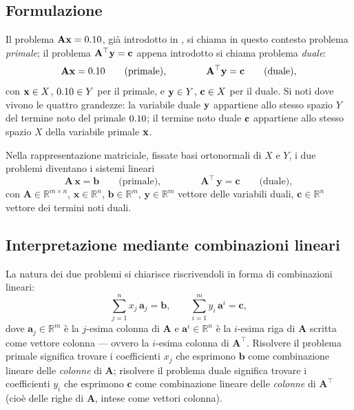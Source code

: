 \subsection{Formulazione}

Il problema $\mathbf{A}\mathbf{x}=0.10$, già introdotto in , si chiama in questo contesto problema \textit{primale}; il problema $\mathbf{A}^\top\mathbf{y}=\mathbf{c}$ appena introdotto si chiama problema \textit{duale}:
\begin{equation}\label{eq:primale}
	\mathbf{A}\mathbf{x}=0.10 \qquad \text{(primale)}, \qquad\qquad
	\mathbf{A}^\top\mathbf{y}=\mathbf{c} \qquad \text{(duale)},
\end{equation}
con $\mathbf{x}\in X$, $0.10\in Y$ per il primale, e $\mathbf{y}\in Y$, $\mathbf{c}\in X$ per il duale. Si noti dove vivono le quattro grandezze: la variabile duale $\mathbf{y}$ appartiene allo stesso spazio $Y$ del termine noto del primale $0.10$; il termine noto duale $\mathbf{c}$ appartiene allo stesso spazio $X$ della variabile primale $\mathbf{x}$. 

Nella rappresentazione matriciale, fissate basi ortonormali di $X$ e $Y$, i due problemi diventano i sistemi lineari
\begin{equation}\label{eq:duale}
	\bm{A}\,\bm{x} = \bm{b} \qquad \text{(primale)}, \qquad\qquad
	\bm{A}^\top\,\bm{y} = \bm{c} \qquad \text{(duale)},
\end{equation}
con $\bm{A} \in \mathbb{R}^{m \times n}$, $\bm{x} \in \mathbb{R}^n$, $\bm{b} \in \mathbb{R}^m$, $\bm{y} \in \mathbb{R}^m$ vettore delle variabili duali, $\bm{c} \in \mathbb{R}^n$ vettore dei termini noti duali.



\subsection{Interpretazione mediante combinazioni lineari}

La natura dei due problemi si chiarisce riscrivendoli in forma di
combinazioni lineari:
\begin{equation}\label{eq:comb_lin_duale}
	\sum_{j=1}^n x_j\,\bm{a}_j = \bm{b}, \qquad
	\sum_{i=1}^m y_i\,\bm{a}^i = \bm{c},
\end{equation}
dove $\bm{a}_j \in \mathbb{R}^m$ \`e la $j$-esima colonna di
$\bm{A}$ e $\bm{a}^i \in \mathbb{R}^n$ \`e la $i$-esima riga di
$\bm{A}$ scritta come vettore colonna --- ovvero la $i$-esima
colonna di $\bm{A}^\top$. Risolvere il problema primale significa
trovare i coefficienti $x_j$ che esprimono $\bm{b}$ come
combinazione lineare delle \textit{colonne} di $\bm{A}$; risolvere
il problema duale significa trovare i coefficienti $y_i$ che
esprimono $\bm{c}$ come combinazione lineare delle \textit{colonne}
di $\bm{A}^\top$ (cio\`e delle righe di $\bm{A}$, intese come
vettori colonna).



